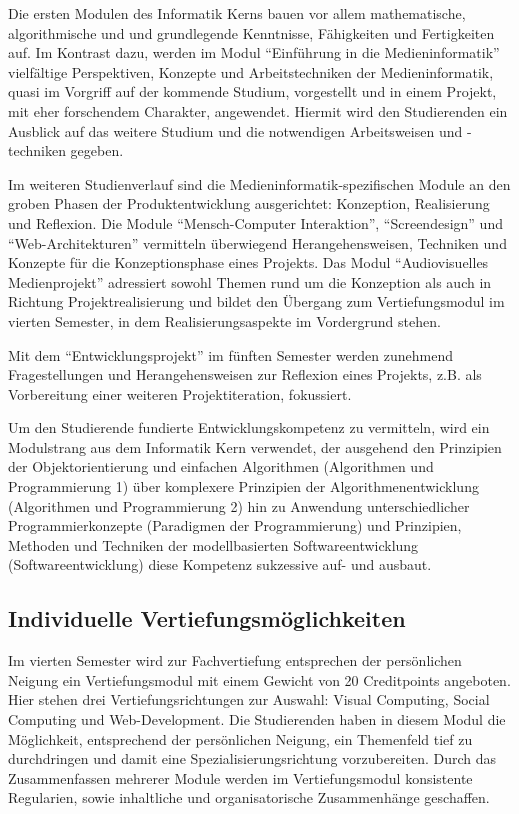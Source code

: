 Die ersten Modulen des Informatik Kerns bauen vor allem mathematische,
algorithmische und und grundlegende Kenntnisse, Fähigkeiten und
Fertigkeiten auf. Im Kontrast dazu, werden im Modul ``Einführung in die
Medieninformatik'' vielfältige Perspektiven, Konzepte und
Arbeitstechniken der Medieninformatik, quasi im Vorgriff auf der
kommende Studium, vorgestellt und in einem Projekt, mit eher forschendem
Charakter, angewendet. Hiermit wird den Studierenden ein Ausblick auf
das weitere Studium und die notwendigen Arbeitsweisen und -techniken
gegeben.

Im weiteren Studienverlauf sind die Medieninformatik-spezifischen Module
an den groben Phasen der Produktentwicklung ausgerichtet: Konzeption,
Realisierung und Reflexion. Die Module ``Mensch-Computer Interaktion'',
``Screendesign'' und ``Web-Architekturen'' vermitteln überwiegend
Herangehensweisen, Techniken und Konzepte für die Konzeptionsphase eines
Projekts. Das Modul ``Audiovisuelles Medienprojekt'' adressiert sowohl
Themen rund um die Konzeption als auch in Richtung Projektrealisierung
und bildet den Übergang zum Vertiefungsmodul im vierten Semester, in dem
Realisierungsaspekte im Vordergrund stehen.

Mit dem ``Entwicklungsprojekt'' im fünften Semester werden zunehmend
Fragestellungen und Herangehensweisen zur Reflexion eines Projekts, z.B.
als Vorbereitung einer weiteren Projektiteration, fokussiert.

Um den Studierende fundierte Entwicklungskompetenz zu vermitteln, wird
ein Modulstrang aus dem Informatik Kern verwendet, der ausgehend den
Prinzipien der Objektorientierung und einfachen Algorithmen (Algorithmen
und Programmierung 1) über komplexere Prinzipien der
Algorithmenentwicklung (Algorithmen und Programmierung 2) hin zu
Anwendung unterschiedlicher Programmierkonzepte (Paradigmen der
Programmierung) und Prinzipien, Methoden und Techniken der
modellbasierten Softwareentwicklung (Softwareentwicklung) diese
Kompetenz sukzessive auf- und ausbaut.

\subsection{Individuelle
Vertiefungsmöglichkeiten}\label{individuelle-vertiefungsmuxf6glichkeiten}

Im vierten Semester wird zur Fachvertiefung entsprechen der persönlichen
Neigung ein Vertiefungsmodul mit einem Gewicht von 20 Creditpoints
angeboten. Hier stehen drei Vertiefungsrichtungen zur Auswahl: Visual
Computing, Social Computing und Web-Development. Die Studierenden haben
in diesem Modul die Möglichkeit, entsprechend der persönlichen Neigung,
ein Themenfeld tief zu durchdringen und damit eine
Spezialisierungsrichtung vorzubereiten. Durch das Zusammenfassen
mehrerer Module werden im Vertiefungsmodul konsistente Regularien, sowie
inhaltliche und organisatorische Zusammenhänge geschaffen.

